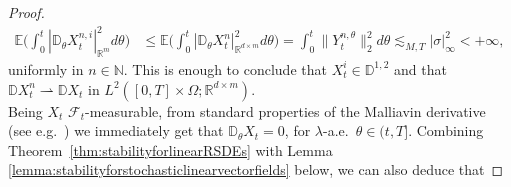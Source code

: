 \documentclass[11pt,a4paper]{article}
\newcommand{\R}{\mathbb{R}}
\newcommand{\E}{\mathbb{E}}
\theoremstyle{plain}
\begin{document}
\begin{proof}
\begin{equation*}
        \begin{aligned}
            \E\big(\int_0^t |\mathbb{D}_\theta X_t^{n,i}|_{\R^m}^2 d\theta\big) &\le \E\big( \int_0^t |\mathbb{D}_\theta X_t^{n}|_{\R^{d\times m}}^2 d\theta\big) 
            = \int_0^t \|Y_t^{n,\theta}\|_2^2 d\theta \lesssim_{M,T} |\sigma|_\infty^2 < +\infty, 
            \end{aligned}
    \end{equation*} uniformly in $n \in \mathbb{N}$. This is enough to conclude that $X_t^i \in \mathbb{D}^{1,2}$ and that $\mathbb{D}X^n_t \rightharpoonup \mathbb{D}X_t$ in $L^2([0,T]\times \Omega;\R^{d\times m})$. \\
    Being $X_t$ $\mathcal{F}_t$-measurable, from standard properties of the Malliavin derivative (see e.g.\ \cite[Corollary 1.2.1]{nualart2006malliavin}) we immediately get that $\mathbb{D}_\theta X_t=0$, for $\lambda$-a.e.\ $\theta \in (t,T]$. 
    Combining Theorem~\ref{thm:stabilityforlinearRSDEs} with Lemma \ref{lemma:stabilityforstochasticlinearvectorfields} below, we can also deduce that
    

\end{proof}
\end{document}
